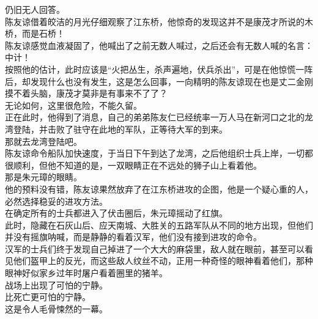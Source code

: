 \begin{multicols}{\theparacolNo}
仍旧无人回答。\\

陈友谅借着皎洁的月光仔细观察了江东桥，他惊奇的发现这并不是康茂才所说的木桥，而是石桥！\\

陈友谅感觉血液凝固了，他喊出了之前无数人喊过，之后还会有无数人喊的名言：\\

中计！\\

按照他的估计，此时应该是“火把丛生，杀声遍地，伏兵杀出”，可是在他惊慌一阵后，却发现什么也没有发生，这是怎么回事，一向精明的陈友谅现在也是丈二金刚摸不着头脑，康茂才莫非是有事来不了了？\\

无论如何，这里很危险，不能久留。\\

正在此时，他得到了消息，自己的弟弟陈友仁已经统率一万人马在新河口之北的龙湾登陆，并击败了驻守在此地的军队，正等待大军的到来。\\

那就去龙湾登陆吧。\\

陈友谅命令船队加快速度，于当日下午到达了龙湾，之后他组织士兵上岸，一切都很顺利，但他不知道的是，一双眼睛正在不远处的狮子山上看着他。\\

那是朱元璋的眼睛。\\

他的预料没有错，陈友谅果然放弃了在江东桥进攻的企图，他是一个疑心重的人，必然选择稳妥的进攻方法。\\

在确定所有的士兵都进入了伏击圈后，朱元璋摇动了红旗。\\

此时，隐藏在石灰山后、应天南城、大胜关的五路军队从不同的地方出现，但他们并没有摇旗呐喊，而是静静的看着汉军，他们没有接到进攻的命令。\\

汉军的士兵们终于发现自己掉进了一个大大的麻袋里，敌人就在眼前，甚至可以看见他们盔甲上的反光，而这些敌人纹丝不动，正用一种奇怪的眼神看着他们，那种眼神好似家乡过年时屠户看着圈里的猪羊。\\

战场上出现了可怕的宁静。\\

比死亡更可怕的宁静。\\

这是令人毛骨悚然的一幕。\\


\end{multicols}
